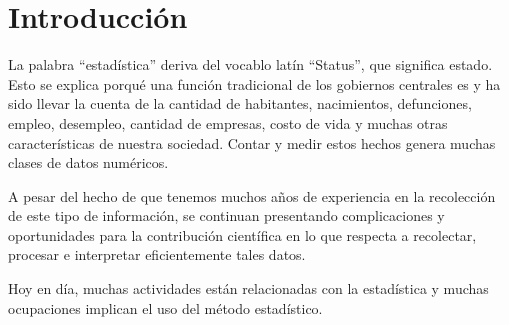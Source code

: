 \section{Introducción}
    La palabra ``estadística'' deriva del vocablo 
    latín ``Status'', que significa estado.
    Esto se explica porqué una función tradicional 
    de los gobiernos centrales es y ha sido llevar 
    la cuenta de la cantidad de habitantes, nacimientos, defunciones,
    empleo, desempleo, cantidad de empresas, costo de vida y muchas
    otras características de nuestra sociedad. Contar y medir estos hechos 
    genera muchas clases de datos numéricos. 
    
    A pesar del hecho de que tenemos muchos 
    años de experiencia en la recolección de este tipo de información, se continuan
    presentando complicaciones y oportunidades para la contribución científica 
    en lo que respecta a recolectar, procesar e interpretar eficientemente tales datos.

    Hoy en día, muchas actividades están relacionadas con la estadística y muchas ocupaciones
    implican el uso del método estadístico.
    
